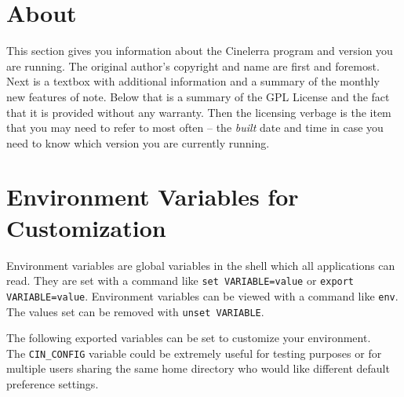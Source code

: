 \section{About}%
\label{sec:about}

This section gives you information about the Cinelerra program and version you are running.  The original author’s copyright and name are first and foremost.  Next is a textbox with additional information and a summary of the monthly new features of note. Below that is a summary of the GPL License and the fact that it is provided without any warranty.  Then the licensing verbage is the item that you may need to refer to most often -- the \textit{built} date and time in case you need to know which version you are currently running.

\section{Environment Variables for Customization}%
\label{sec:environment_variables_customization}

Environment variables are global variables in the shell which all applications can read. They are set with a command like \texttt{set VARIABLE=value} or \texttt{export VARIABLE=value}. Environment variables can be viewed with a command like \texttt{env}.   The values set can be removed with \texttt{unset VARIABLE}.

The following exported variables can be set to customize your environment. \\ The \texttt{CIN\_CONFIG} variable could be extremely useful for testing purposes or for multiple users sharing the same home directory who would like different default preference settings.

